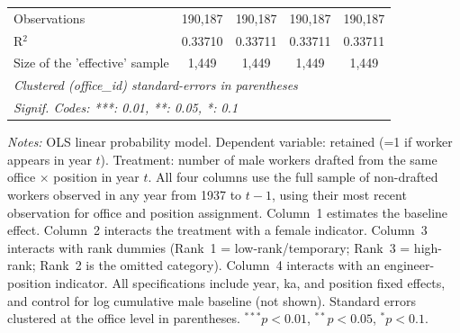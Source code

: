 \begin{table}[htbp]
\begin{threeparttable}
\begin{tabular}{lcccc}
   Observations                   & 190,187  & 190,187          & 190,187        & 190,187\\  
   R$^2$                          & 0.33710  & 0.33711          & 0.33711        & 0.33711\\  
   Size of the 'effective' sample & 1,449    & 1,449            & 1,449          & 1,449\\  
   \midrule \midrule
   \multicolumn{5}{l}{\emph{Clustered (office\_id) standard-errors in parentheses}}\\
   \multicolumn{5}{l}{\emph{Signif. Codes: ***: 0.01, **: 0.05, *: 0.1}}\\
\end{tabular}
\begin{tablenotes}[flushleft]
\footnotesize
\item \textit{Notes:} OLS linear probability model. Dependent variable: retained (=1 if worker appears in year $t$). Treatment: number of male workers drafted from the same office $\times$ position in year $t$. All four columns use the full sample of non-drafted workers observed in any year from 1937 to $t-1$, using their most recent observation for office and position assignment. Column~1 estimates the baseline effect. Column~2 interacts the treatment with a female indicator. Column~3 interacts with rank dummies (Rank~1 = low-rank/temporary; Rank~3 = high-rank; Rank~2 is the omitted category). Column~4 interacts with an engineer-position indicator. All specifications include year, ka, and position fixed effects, and control for log cumulative male baseline (not shown). Standard errors clustered at the office level in parentheses. $^{***}p<0.01$, $^{**}p<0.05$, $^{*}p<0.1$.
\end{tablenotes}
\end{threeparttable}
\end{table}
